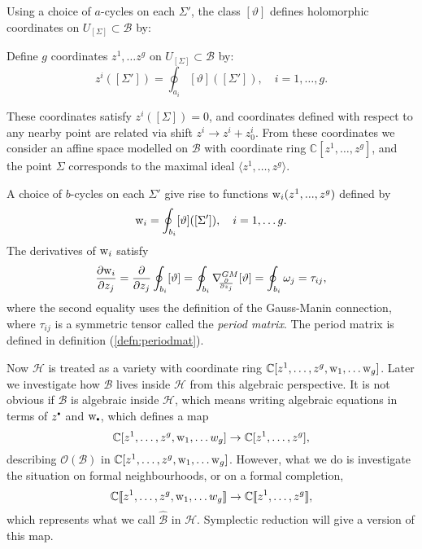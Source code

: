     Using a choice of \(a\)-cycles on each \(\Sigma'\), the class \([\vartheta]\) defines holomorphic coordinates on \( U_{[\Sigma]}\subset\mathcal{B}\) by:
    \begin{defn}  Define \(g\) coordinates \( {z^1, \dots z^g}\) on \(U_{[\Sigma]} \subset \mathcal{B}\) by: 
    \begin{equation}  \label{eqn:zcoords}
        z^i([\Sigma'])=\oint_{a_i}[\vartheta]([\Sigma']),\quad i=1,\dots,g.
    \end{equation}
    \end{defn}
    These coordinates satisfy \(z^i([\Sigma])=0\), and coordinates defined with respect to any nearby point are related via shift \(z^i\rightarrow z^i+z^i_0\). From these coordinates we consider an affine space modelled on \( \mathcal{B}\) with coordinate ring \( \mathbb{C}[z^1, \dots , z^g]\), and the point \(\Sigma\) corresponds to the maximal ideal \( \langle z^1, \dots , z^g\rangle\). 
    
    A choice of \(b\)-cycles on each \(\Sigma'\) give rise to functions \(\mathrm{w}_i(z^1,...,z^g)\) defined by 
    \begin{equation} 
    \label{eqn:wcoords}
    \mathrm{w}_i=\oint_{b_i}[\vartheta]([\Sigma']), \quad i = 1, \dots g.
    \end{equation}
    The derivatives of \(\mathrm{w}_i\) satisfy
    \[ \frac{\partial \mathrm{w}_i}{\partial z_j}=\frac{\partial}{\partial z_j}\oint_{b_i}[\vartheta]=\oint_{b_i}\nabla^{GM}_{\hspace{-1mm}\frac{\partial}{\partial z_j}}[\vartheta]=\oint_{b_i}\omega_j=\tau_{ij},\]
    where the second equality uses the definition of the Gauss-Manin connection, where \(\tau_{ij}\) is a symmetric tensor called the \emph{period matrix}. The period matrix is defined in definition (\ref{defn:periodmat}).
    
    Now \( \mathcal{H}\) is treated as a variety with coordinate ring \( \mathbb{C}[z^1, \dots , z^g, \mathrm{w}_1, \dots \mathrm{w}_g]\). Later we investigate how \( \mathcal{B}\) lives inside \( \mathcal{H}\) from this algebraic perspective.  It is not obvious if \( \mathcal{B}\) is algebraic inside \( \mathcal{H}\), which means writing algebraic equations in terms of \(z^{\sbt}\) and \(\w_{\sbt}\), which defines a map \[ \mathbb{C}[z^1, \dots , z^g, \mathrm{w}_1, \dots w_g] \rightarrow \mathbb{C} [ z^1, \dots , z^g ], \]
    describing \( \mathcal{O}(\mathcal{B})\) in \( \mathbb{C}[z^1, \dots , z^g, \mathrm{w}_1, \dots \mathrm{w}_g]\). 
    However, what we do is investigate the situation on formal neighbourhoods, or on a formal completion, 
    \[ \mathbb{C} [\![ z^1, \dots , z^g, \mathrm{w}_1, \dots w_g ]\!] \rightarrow \mathbb{C} 
    [\![ z^1, \dots , z^g ]\!], \]
    which represents what we call \( \widehat{\mathcal{B}}\) in \( \mathcal{H}\). Symplectic reduction will give a version of this map.
    
